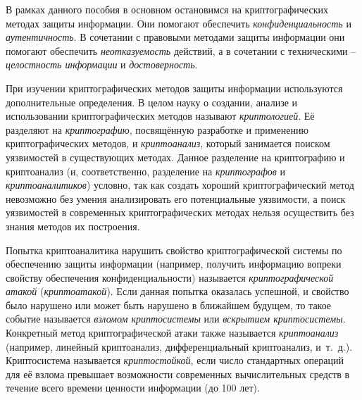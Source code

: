 В рамках данного пособия в основном остановимся на криптографических методах защиты информации. Они помогают обеспечить \emph{конфиденциальность} и \emph{аутентичность}. В сочетании с правовыми методами защиты информации они помогают обеспечить \emph{неотказуемость} действий, а в сочетании с техническими -- \emph{целостность информации} и \emph{достоверность}.

При изучении криптографических методов защиты информации используются дополнительные определения. В целом науку о создании, анализе и использовании криптографических методов называют \emph{криптологией}. Её разделяют на \emph{криптографию}, посвящённую разработке и применению криптографических методов, и \emph{криптоанализ}, который занимается поиском уязвимостей в существующих методах. Данное разделение на криптографию и криптоанализ (и, соответственно, разделение на \emph{криптографов} и \emph{криптоаналитиков}) условно, так как создать хороший криптографический метод невозможно без умения анализировать его потенциальные уязвимости, а поиск уязвимостей в современных криптографических методах нельзя осуществить без знания методов их построения.

Попытка криптоаналитика нарушить свойство криптографической системы по обеспечению защиты информации (например, получить информацию вопреки свойству обеспечения конфиденциальности) называется \emph{криптографической атакой} (\emph{криптоатакой}). Если данная попытка оказалась успешной, и свойство было нарушено или может быть нарушено в ближайшем будущем, то такое событие называется \emph{взломом криптосистемы} или \emph{вскрытием криптосистемы}. Конкретный метод криптографической атаки также называется \emph{криптоанализ} (например, линейный криптоанализ, дифференциальный криптоанализ, и~т.~д.). Криптосистема называется \emph{криптостойкой}, если число стандартных операций для её взлома превышает возможности современных вычислительных средств в течение всего времени ценности информации (до 100 лет).

